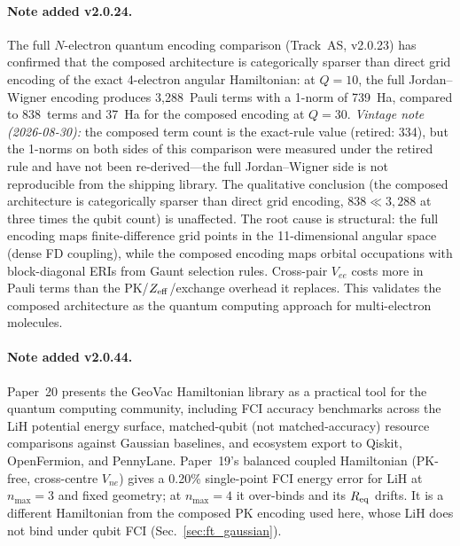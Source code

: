 \documentclass[aps,pra,twocolumn,superscriptaddress,longbibliography]{revtex4-2}
\begin{document}
\paragraph{Note added v2.0.24.}
The full $N$-electron quantum encoding comparison (Track~AS,
v2.0.23) has confirmed that the composed architecture is categorically
sparser than direct grid encoding of the exact 4-electron angular
Hamiltonian: at $Q = 10$, the full Jordan--Wigner encoding produces
3{,}288~Pauli terms with a 1-norm of 739~Ha, compared to
838~terms and 37~Ha for the composed encoding at $Q = 30$.
\emph{Vintage note (2026-08-30):} the composed term count is the
exact-rule value (retired: 334), but the 1-norms on both sides of this
comparison were measured under the retired rule and have not been
re-derived---the full Jordan--Wigner side is not reproducible from the
shipping library.  The qualitative conclusion (the composed architecture
is categorically sparser than direct grid encoding, $838 \ll 3{,}288$ at
three times the qubit count) is unaffected.
The root cause is structural: the full encoding maps finite-difference
grid points in the 11-dimensional angular space (dense FD coupling),
while the composed encoding maps orbital occupations with
block-diagonal ERIs from Gaunt selection rules.  Cross-pair $V_{ee}$
costs more in Pauli terms than the PK/$Z_{\rm eff}$/exchange overhead
it replaces.  This validates the composed architecture as the quantum
computing approach for multi-electron molecules.

\paragraph{Note added v2.0.44.}
Paper~20 presents the GeoVac Hamiltonian library as a practical tool
for the quantum computing community, including FCI accuracy benchmarks
across the LiH potential energy surface, matched-qubit (not
matched-accuracy) resource comparisons against Gaussian baselines,
and ecosystem export to
Qiskit, OpenFermion, and PennyLane.  Paper~19's balanced coupled
Hamiltonian (PK-free, cross-centre $V_{ne}$) gives a 0.20\% single-point
FCI energy error for LiH at $n_{\max}=3$ and fixed geometry; at
$n_{\max}=4$ it over-binds and its $R_{\rm eq}$ drifts.  It is a
different Hamiltonian from the composed PK encoding used here, whose
LiH does not bind under qubit FCI (Sec.~\ref{sec:ft_gaussian}).
\end{document}
